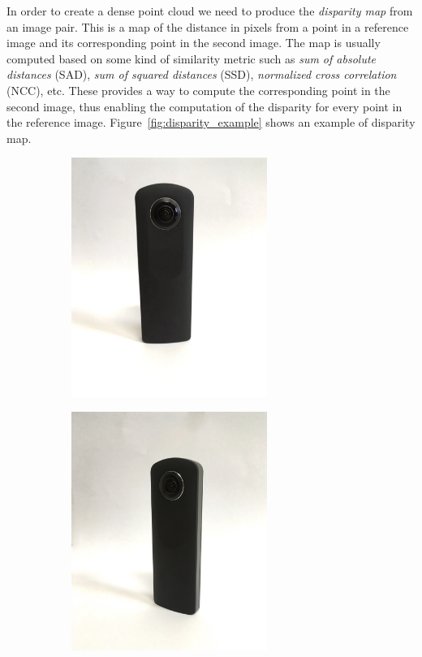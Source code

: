 In order to create a dense point cloud we need to produce the 
\textit{disparity map} from an image pair. This is a map of the distance in 
pixels from a point in a reference image and its corresponding point in the 
second image. The map is usually computed based on some kind of similarity 
metric such as \textit{sum of absolute distances} (SAD), 
\textit{sum of squared distances} (SSD), 
\textit{normalized cross correlation} (NCC), etc. These provides a way to 
compute the corresponding point in the second image, thus enabling the 
computation of the disparity for every point in the reference image.
Figure~\ref{fig:disparity_example} shows an example of disparity map.
\begin{figure}[h]
	\centering
	\begin{subfigure}{0.3\textwidth}
		\centering
		\includegraphics[width=0.7\textwidth]{img/theta1}
	\end{subfigure}
	\begin{subfigure}{0.3\textwidth}
		\centering
		\includegraphics[width=0.7\textwidth]{img/theta2}

\end{subfigure}
\end{figure}
